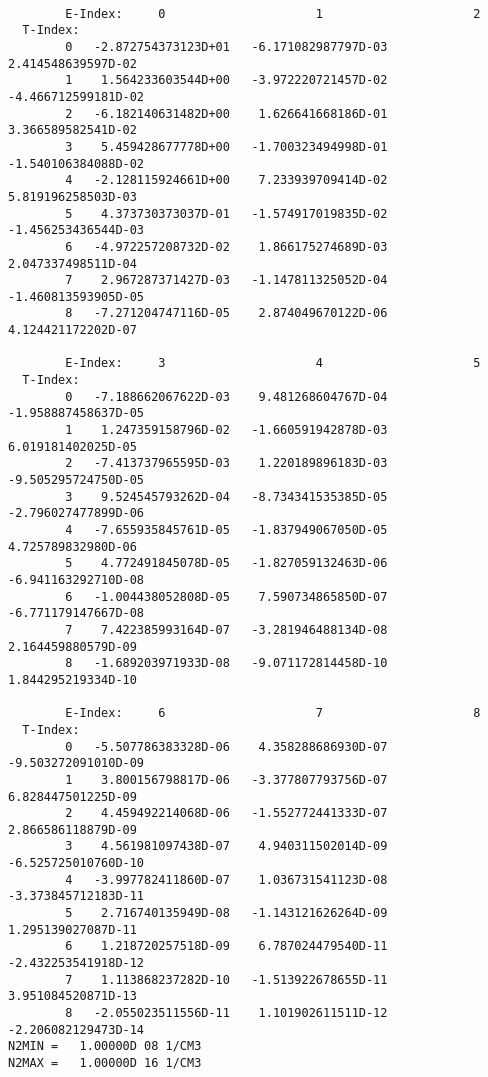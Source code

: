 \documentclass[12pt,dvipdfmx]{article}
\begin{document}
{\begin{small}\begin{verbatim}

        E-Index:     0                     1                     2
  T-Index:
        0   -2.872754373123D+01   -6.171082987797D-03    2.414548639597D-02
        1    1.564233603544D+00   -3.972220721457D-02   -4.466712599181D-02
        2   -6.182140631482D+00    1.626641668186D-01    3.366589582541D-02
        3    5.459428677778D+00   -1.700323494998D-01   -1.540106384088D-02
        4   -2.128115924661D+00    7.233939709414D-02    5.819196258503D-03
        5    4.373730373037D-01   -1.574917019835D-02   -1.456253436544D-03
        6   -4.972257208732D-02    1.866175274689D-03    2.047337498511D-04
        7    2.967287371427D-03   -1.147811325052D-04   -1.460813593905D-05
        8   -7.271204747116D-05    2.874049670122D-06    4.124421172202D-07

        E-Index:     3                     4                     5
  T-Index:
        0   -7.188662067622D-03    9.481268604767D-04   -1.958887458637D-05
        1    1.247359158796D-02   -1.660591942878D-03    6.019181402025D-05
        2   -7.413737965595D-03    1.220189896183D-03   -9.505295724750D-05
        3    9.524545793262D-04   -8.734341535385D-05   -2.796027477899D-06
        4   -7.655935845761D-05   -1.837949067050D-05    4.725789832980D-06
        5    4.772491845078D-05   -1.827059132463D-06   -6.941163292710D-08
        6   -1.004438052808D-05    7.590734865850D-07   -6.771179147667D-08
        7    7.422385993164D-07   -3.281946488134D-08    2.164459880579D-09
        8   -1.689203971933D-08   -9.071172814458D-10    1.844295219334D-10

        E-Index:     6                     7                     8
  T-Index:
        0   -5.507786383328D-06    4.358288686930D-07   -9.503272091010D-09
        1    3.800156798817D-06   -3.377807793756D-07    6.828447501225D-09
        2    4.459492214068D-06   -1.552772441333D-07    2.866586118879D-09
        3    4.561981097438D-07    4.940311502014D-09   -6.525725010760D-10
        4   -3.997782411860D-07    1.036731541123D-08   -3.373845712183D-11
        5    2.716740135949D-08   -1.143121626264D-09    1.295139027087D-11
        6    1.218720257518D-09    6.787024479540D-11   -2.432253541918D-12
        7    1.113868237282D-10   -1.513922678655D-11    3.951084520871D-13
        8   -2.055023511556D-11    1.101902611511D-12   -2.206082129473D-14
N2MIN =   1.00000D 08 1/CM3
N2MAX =   1.00000D 16 1/CM3


\end{verbatim}
\end{small}}
\end{document}
